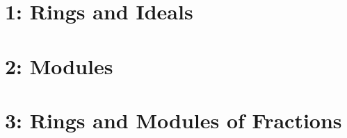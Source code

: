 \documentclass[10pt]{report}
\begin{document}
\chapter*{1: Rings and Ideals}



 






\chapter*{2: Modules}




\chapter*{3: Rings and Modules of Fractions}

\end{document}
